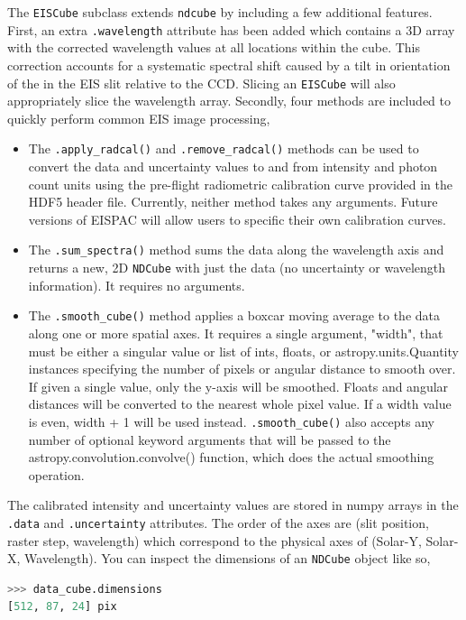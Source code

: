 The \verb+EISCube+ subclass extends \verb+ndcube+ by including a few additional features.
First, an extra \verb+.wavelength+ attribute has been added which contains a 3D array
with the corrected wavelength values at all locations within the cube. This correction accounts for a
systematic spectral shift caused by a tilt in orientation of the in the EIS slit relative to the CCD.
Slicing an \verb+EISCube+ will also appropriately slice the wavelength array. Secondly, four methods
are included to quickly perform common EIS image processing,

\begin{itemize}
    \item The \verb+.apply_radcal()+ and \verb+.remove_radcal()+ methods can be used to convert the
    data and uncertainty values to and from intensity and photon count units using the pre-flight
    radiometric calibration curve provided in the HDF5 header file. Currently, neither method takes
    any arguments. Future versions of EISPAC will allow users to specific their own calibration curves.
    \item The \verb+.sum_spectra()+ method sums the data along the wavelength axis and returns a new, 2D \verb+NDCube+ with just the data (no uncertainty or wavelength information). It requires no arguments.
    \item The \verb+.smooth_cube()+ method applies a boxcar moving average to the data along one or more spatial axes. It requires a single argument, "width", that must be either a singular value or list of ints, floats, or astropy.units.Quantity instances specifying the number of pixels or angular distance to smooth over. If given a single value, only the y-axis will be smoothed. Floats and angular distances will be converted to the nearest whole pixel value. If a width value is even, width + 1 will be used instead. \verb+.smooth_cube()+ also accepts any number of optional keyword arguments that will be passed to the astropy.convolution.convolve()
    function, which does the actual smoothing operation.
\end{itemize}

The calibrated intensity and uncertainty values are stored in numpy arrays in the \verb+.data+ and \verb+.uncertainty+ attributes. The order of the axes are (slit position, raster step, wavelength) which correspond to the physical axes of (Solar-Y, Solar-X, Wavelength). You can inspect the dimensions of an \verb+NDCube+ object like so,

\begin{lstlisting}[language=Python]
>>> data_cube.dimensions
[512, 87, 24] pix
\end{lstlisting}

